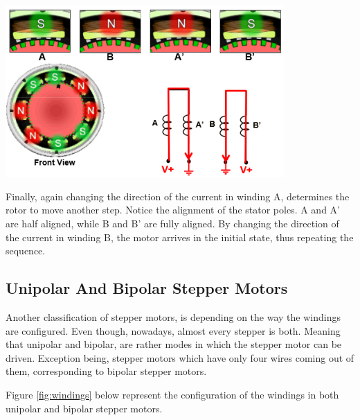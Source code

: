 \begin{center}
	\includegraphics[width=0.8\textwidth]{figures/move/motor35}
	\label{fig:hybrid_forth_step}
\end{center}


Finally, again changing the direction of the current in winding A, determines the rotor to move 
another step. Notice the alignment of the stator poles. A and A’ are half aligned, while B and B’ 
are fully aligned. By changing the direction of the current in winding B, the motor arrives in the 
initial state, thus repeating the sequence.


\subsection{Unipolar And Bipolar Stepper Motors}

Another classification of stepper motors, is depending on the way the windings are configured.
Even though, nowadays, almost every stepper is both.
Meaning that unipolar and bipolar, are rather modes in which the stepper motor can be driven.
Exception being, stepper motors which have only four wires coming out of them, corresponding to 
bipolar stepper motors.

Figure \ref{fig:windings} below represent the configuration of the windings in both unipolar and 
bipolar stepper motors. 


